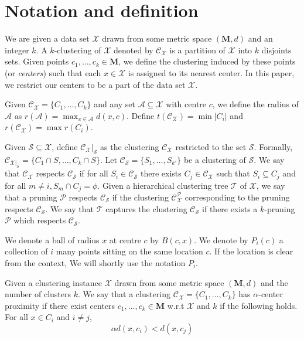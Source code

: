 \documentclass[anon,12pt]{colt2016} %
\newcommand{\mc}{\mathcal}
\newcommand{\mb}{\mathbf}
\begin{document}
\section{Notation and definition}
We are given a data set $\mc X$ drawn from some metric space $(\mb M, d)$ and an integer $k$. A $k$-clustering of $\mc X$ denoted by $\mc C_{\mc X}$ is a partition of $\mc X$ into $k$ disjoints sets. Given points $c_1, \ldots, c_k \in \mb M$, we define the clustering induced by these points (or {\it centers}) such that each $x \in \mc X$ is assigned to its nearest center. In this paper, we restrict our centers to be a part of the data set $\mc X$. 

Given $\mc C_{\mc X} = \{C_1, \ldots, C_k\}$ and any set $\mc A\subseteq \mc X$ with centre $c$, we define the radius of $\mc A$ as $r(\mc A) = \max_{x \in \mc A} d(x, c)$. Define $t(\mc{C}_{\mc{X}}) = \min |C_i|$ and $r(\mc{C}_{\mc{X}}) = \max r(C_i)$. 

Given $\mc S \subseteq \mc X$, define $\mc C_{\mc X}|_{\mc S}$ as the clustering $\mc C_{\mc X}$ restricted to the set $\mc S$. Formally, $\mc C_{{\mc X}|_{\mc S}} = \{C_1 \cap S, \ldots, C_k \cap S\}$. Let $\mc C_{\mc S} = \{S_1, \ldots, S_{k'}\}$ be a clustering of $\mc S$. We say that $\mc C_{\mc X}$ respects $\mc C_{\mc S}$ if for all $S_i \in \mc C_{\mc S}$ there exists $C_j \in \mc C_{\mc X}$ such that $S_i \subseteq C_j$ and for all $m \neq i, S_m \cap C_j = \phi$. Given a hierarchical clustering tree $\mc T$ of $\mc X$, we say that a pruning $\mc P$ respects $\mc C_{\mc S}$ if the clustering $\mc C_{\mc X}^{\mc P}$ corresponding to the pruning respects $\mc C_{\mc S}$. We say that $\mc T$ captures the clustering $\mc C_{\mc S}$ if there exists a $k$-pruning $\mc P$ which respects $\mc C_{\mc S}$.

We denote a ball of radius $x$ at centre $c$ by $B(c, x)$. We denote by $P_{i}(c)$ a collection of $i$ many points sitting on the same location $c$. If the location is clear from the context, We will shortly use the notation $P_i$.

\begin{definition}
\label{defn:alphacp}
Given a clustering instance $\mc X$ drawn from some metric space $(\mb M, d)$ and the number of clusters $k$. We say that a clustering $\mc C_{\mc X} = \{C_1, \ldots, C_k\}$ has $\alpha$-center proximity if there exist centers $c_1, \ldots, c_k \in \mb M$ w.r.t $\mc X$ and $k$ if the following holds. For all $x \in C_i$ and $i\neq j$, 
$$\alpha d(x, c_i) < d(x, c_j)$$
\end{definition}
\end{document}
